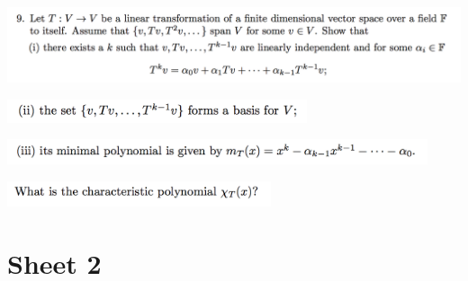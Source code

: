 \documentclass[12pt]{article}
\begin{document}
\subsection*{} %
\begin{mdframed}
\includegraphics[width=400pt]{img/linear-algebra-a0-1-9-a.png}\\
\end{mdframed}
\begin{mdframed}
\includegraphics[width=250pt]{img/linear-algebra-a0-1-9-b.png}\\
\end{mdframed}
\begin{mdframed}
\includegraphics[width=350pt]{img/linear-algebra-a0-1-9-c.png}\\
\end{mdframed}
\begin{mdframed}
\includegraphics[width=220pt]{img/linear-algebra-a0-1-9-d.png}\\
\end{mdframed}

\newpage
\section*{Sheet 2}
\end{document}
